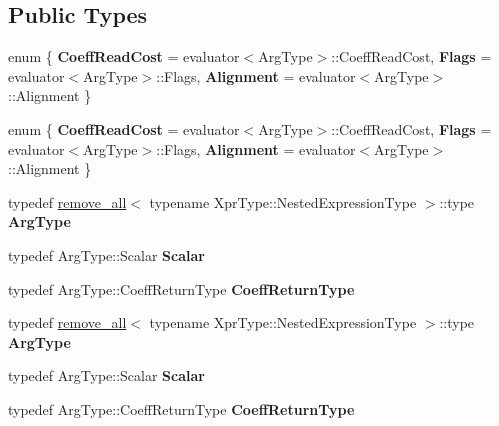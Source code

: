 \subsection*{Public Types}
\begin{DoxyCompactItemize}
\item 
\mbox{\label{struct_eigen_1_1internal_1_1evaluator__wrapper__base_ac5eb93546968f1eb13fb4bf48937e127}} 
enum \{ {\bfseries Coeff\+Read\+Cost} = evaluator$<$Arg\+Type$>$\+:\+:Coeff\+Read\+Cost, 
{\bfseries Flags} = evaluator$<$Arg\+Type$>$\+:\+:Flags, 
{\bfseries Alignment} = evaluator$<$Arg\+Type$>$\+:\+:Alignment
 \}
\item 
\mbox{\label{struct_eigen_1_1internal_1_1evaluator__wrapper__base_ab1e220893516d3ed6383653d3a678662}} 
enum \{ {\bfseries Coeff\+Read\+Cost} = evaluator$<$Arg\+Type$>$\+:\+:Coeff\+Read\+Cost, 
{\bfseries Flags} = evaluator$<$Arg\+Type$>$\+:\+:Flags, 
{\bfseries Alignment} = evaluator$<$Arg\+Type$>$\+:\+:Alignment
 \}
\item 
\mbox{\label{struct_eigen_1_1internal_1_1evaluator__wrapper__base_a5a503ef21501a96d1c29c142d0ef5464}} 
typedef \hyperlink{struct_eigen_1_1internal_1_1remove__all}{remove\+\_\+all}$<$ typename Xpr\+Type\+::\+Nested\+Expression\+Type $>$\+::type {\bfseries Arg\+Type}
\item 
\mbox{\label{struct_eigen_1_1internal_1_1evaluator__wrapper__base_a4da29230682439ead46dabc2d12254b4}} 
typedef Arg\+Type\+::\+Scalar {\bfseries Scalar}
\item 
\mbox{\label{struct_eigen_1_1internal_1_1evaluator__wrapper__base_a27a59fe6d1013f9ad31889a4fd84ceb0}} 
typedef Arg\+Type\+::\+Coeff\+Return\+Type {\bfseries Coeff\+Return\+Type}
\item 
\mbox{\label{struct_eigen_1_1internal_1_1evaluator__wrapper__base_a5a503ef21501a96d1c29c142d0ef5464}} 
typedef \hyperlink{struct_eigen_1_1internal_1_1remove__all}{remove\+\_\+all}$<$ typename Xpr\+Type\+::\+Nested\+Expression\+Type $>$\+::type {\bfseries Arg\+Type}
\item 
\mbox{\label{struct_eigen_1_1internal_1_1evaluator__wrapper__base_a4da29230682439ead46dabc2d12254b4}} 
typedef Arg\+Type\+::\+Scalar {\bfseries Scalar}
\item 
\mbox{\label{struct_eigen_1_1internal_1_1evaluator__wrapper__base_a27a59fe6d1013f9ad31889a4fd84ceb0}} 
typedef Arg\+Type\+::\+Coeff\+Return\+Type {\bfseries Coeff\+Return\+Type}
\end{DoxyCompactItemize}
